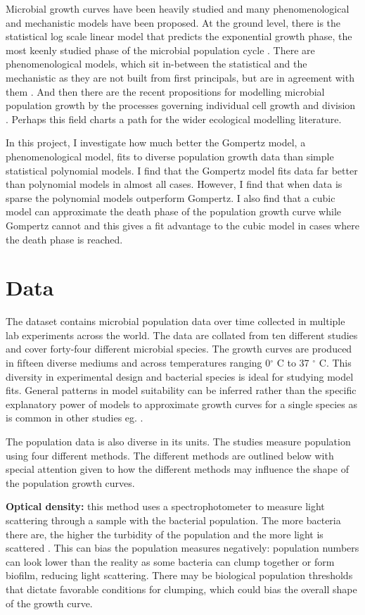 \documentclass[11pt]{article}
\begin{document}
    Microbial growth curves have been heavily studied and many phenomenological and mechanistic models have been proposed. At the ground level, there is the statistical log scale linear model that predicts the exponential growth phase, the most keenly studied phase of the microbial population cycle \cite{Peleg2011}. There are phenomenological models, which sit in-between the statistical and the mechanistic as they are not built from first principals, but are in agreement with them \citep{Allen2018}. And then there are the recent propositions for modelling microbial population growth by the processes governing individual cell growth and division \citep{Jafarpour2019}. Perhaps this field charts a path for the wider ecological modelling literature.

    In this project, I investigate how much better the Gompertz model, a phenomenological model, fits to diverse population growth data than simple statistical polynomial models. I find that the Gompertz model fits data far better than polynomial models in almost all cases. However, I find that when data is sparse the polynomial models outperform Gompertz. I also find that a cubic model can approximate the death phase of the population growth curve while Gompertz cannot and this gives a fit advantage to the cubic model in cases where the death phase is reached.
  
  \section{Data}
  The dataset contains microbial population data over time collected in multiple lab experiments across the world.  The data are collated from ten different studies and cover forty-four different microbial species. The growth curves are produced in fifteen diverse mediums and across temperatures ranging 0$^{\circ}$ C to 37 $^{\circ}$ C. This diversity in experimental design and bacterial species is ideal for studying model fits. General patterns in model suitability can be inferred rather than the specific explanatory power of models to approximate growth curves for a single species as is common in other studies eg. \cite{Zwietering1990}.

  The population data is also diverse in its units. The studies measure population using four different methods. The different methods are outlined below with special attention given to how the different methods may influence the shape of the population growth curves.

  \textbf{Optical density:} this method uses a spectrophotometer to measure light scattering through a sample with the bacterial population. The more bacteria there are, the higher the turbidity of the population and the more light is scattered \cite{Madigan_Michael2021-07-01}. This can bias the population measures negatively: population numbers can look lower than the reality as some bacteria can clump together or form biofilm, reducing light scattering. There may be biological population thresholds that dictate favorable conditions for clumping, which could bias the overall shape of the growth curve. 
\end{document}
